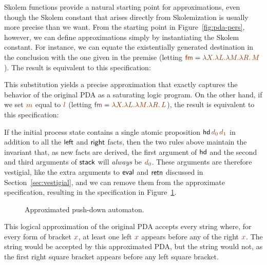 Skolem functions provide a natural starting point for approximations,
even though the Skolem constant that arises directly from
Skolemization is usually more precise than we want. From the starting
point in Figure~\ref{fig:pda-pers}, however, we can define
approximations simply by instantiating the Skolem constant.  For
instance, we can equate the existentially generated destination in the
conclusion with the one given in the premise (letting $\lf{\sf fm} =
\lf{\lambda X. \lambda L. \lambda M. \lambda R.\, M}$). The result is
equivalent to this specification:

\smallskip
{}
\smallskip

\noindent This substitution yields a precise approximation
that exactly captures the behavior of the original PDA as a saturating
logic program. On the other hand, if we set $\lf{m}$ equal to $\lf{l}$ 
(letting $\lf{\sf fm} = \lf{\lambda X. \lambda L. \lambda M. \lambda R.\, L}$), 
the result is equivalent to this specification:

\smallskip
{}
\smallskip


If the initial process state contains a single atomic proposition
${\sf hd}\,\lf{d_0}\,\lf{d_1}$ in addition to all the ${\sf left}$ and ${\sf
  right}$ facts, then the two rules above maintain the invariant that,
as new facts are derived, the first argument of ${\sf hd}$ and the
second and third arguments of ${\sf stack}$ will {\it always} be
$\lf{d_0}$.  These arguments are therefore vestigial, like the extra
arguments to ${\sf eval}$ and ${\sf retn}$ discussed in
Section~\ref{sec:vestigial}, and we can remove them from the
approximate specification, resulting in the specification in
Figure~\ref{fig:pda-pers-approx2}. 

\begin{figure}[ht]
\caption{Approximated push-down automaton.}
\label{fig:pda-pers-approx2}
\end{figure}

This logical approximation of the
original PDA accepts every string where, for every form of bracket
$\lf{x}$, at least one left $\lf{x}$ appears before any of the right 
$\lf{x}$. The
string \obj{\mbox{\sf [ ] ] ] ( ( )}} 
would be accepted by this approximated PDA,
but the string \obj{\mbox{\sf ( ) ] [ [ ]}} 
would not, as the first right square
bracket appears before any left square bracket.


